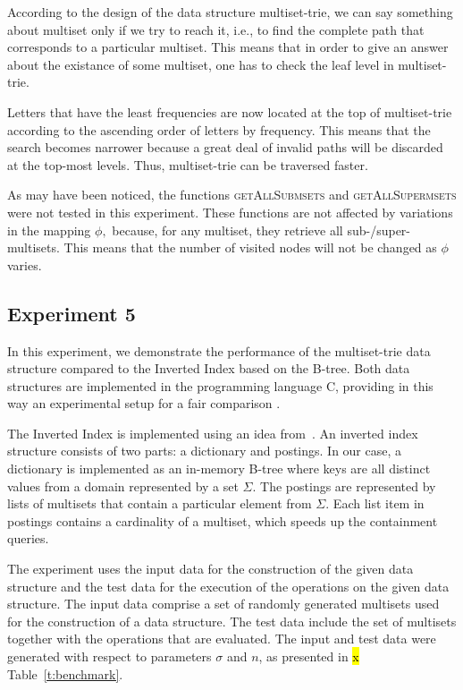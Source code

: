 \documentclass[algorithms,article,accept,pdftex,moreauthors]{Definitions/mdpi}
\newcommand{\CC}{C\nolinebreak\hspace{-.05em}\raisebox{.4ex}{\tiny\bf ++}}
\begin{document}
According to the design of the data structure multiset-trie, we can say 
something about multiset only if we try to reach it, i.e., to find the complete 
path that corresponds to a particular multiset. This means that in order to give 
an answer about the existance of some multiset, one has to check the leaf level in 
multiset-trie. 

Letters that have the least frequencies are now located at the top of 
multiset-trie according to the ascending order of letters by frequency. This means 
that the search becomes narrower because a great deal of invalid paths will be 
discarded at the top-most levels. Thus, multiset-trie can be traversed faster.

As may have been noticed, the functions \textsc{getAllSubmsets} and 
\textsc{getAllSupermsets} were not tested in this experiment. These functions 
are not affected by variations in the mapping $\phi,$ because, for any multiset, 
they retrieve all sub-/super-multisets. This means that the number of visited 
nodes will not be changed as $\phi$ varies.

\subsection{Experiment 5} \label{s:exp5}

In this experiment, we demonstrate the performance of the multiset-trie
data structure compared to the Inverted Index based on the
B-tree. Both data structures are implemented in the programming
language \CC, providing in this way an experimental setup for a fair
comparison \cite{akulich2019mstrie}.

The Inverted Index is implemented using an idea
from~\cite{Helmer2003}. An inverted index structure consists of two
parts: a dictionary and postings. In our case, a dictionary is
implemented as an in-memory B-tree where keys are all distinct values
from a domain represented by a set $\Sigma.$ The postings are
represented by lists of multisets that contain a particular element
from $\Sigma.$ Each list item in postings contains a cardinality of a
multiset, which speeds up the containment queries.

The experiment uses the input data for the construction of the given
data structure and the test data for the execution of the operations
on the given data structure. The input data comprise a set of
randomly generated multisets used for the construction of a data
structure. The test data include the set of multisets together with
the operations that are evaluated. The input and test data were
generated with respect to parameters $\sigma$ and $n$, as presented in
\hl{x} %
 Table~\ref{t:benchmark}.
\end{document}

